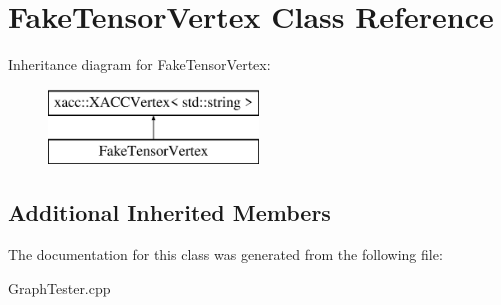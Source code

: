 \hypertarget{a01563}{}\section{Fake\+Tensor\+Vertex Class Reference}
\label{a01563}
Inheritance diagram for Fake\+Tensor\+Vertex\+:\begin{figure}[H]
\begin{center}
\leavevmode
\includegraphics[height=2.000000cm]{a01563}
\end{center}
\end{figure}
\subsection*{Additional Inherited Members}


The documentation for this class was generated from the following file\+:\begin{DoxyCompactItemize}
\item 
Graph\+Tester.\+cpp\end{DoxyCompactItemize}
